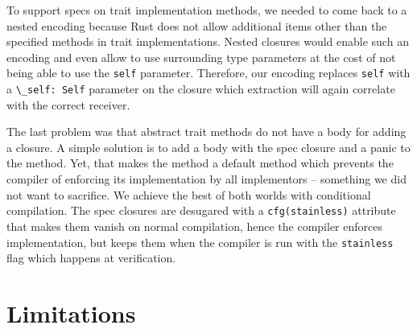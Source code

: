 To support specs on trait implementation methods, we needed to come back
to a nested encoding because Rust does not allow additional items other
than the specified methods in trait implementations. Nested closures
would enable such an encoding and even allow to use surrounding type
parameters at the cost of not being able to use the
\passthrough{\lstinline!self!} parameter. Therefore, our encoding
replaces \passthrough{\lstinline!self!} with a
\passthrough{\lstinline!\_self: Self!} parameter on the closure which
extraction will again correlate with the correct receiver.

The last problem was that abstract trait methods do not have a body for
adding a closure. A simple solution is to add a body with the spec
closure and a panic to the method. Yet, that makes the method a default
method which prevents the compiler of enforcing its implementation by
all implementors -- something we did not want to sacrifice. We achieve
the best of both worlds with conditional compilation. The spec closures
are desugared with a \passthrough{\lstinline!cfg(stainless)!} attribute
that makes them vanish on normal compilation, hence the compiler
enforces implementation, but keeps them when the compiler is run with
the \passthrough{\lstinline!stainless!} flag which happens at
verification.



\section{Limitations}
\label{impl-limitations}
